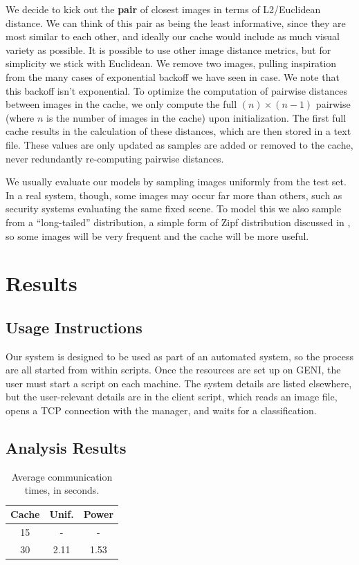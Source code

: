 \documentclass[12pt]{article}
\begin{document}
We decide to kick out the \textbf{pair} of closest images in terms of L2/Euclidean distance. We can think of this pair as being the least informative, since they are most similar to each other, and ideally our cache would include as much visual variety as possible. It is possible to use other image distance metrics, but for simplicity we stick with Euclidean. We remove two images, pulling inspiration from the many cases of exponential backoff we have seen in case. We note that this backoff isn't exponential. To optimize the computation of pairwise distances between images in the cache, we only compute the full $(n) \times (n-1)$ pairwise (where $n$ is the number of images in the cache) upon initialization. The first full cache results in the calculation of these distances, which are then stored in a text file. These values are only updated as samples are added or removed to the cache, never redundantly re-computing pairwise distances.

We usually evaluate our models by sampling images uniformly from the test set.
In a real system, though, some images may occur far more than others, such as security systems evaluating the same fixed scene.
To model this we also sample from a ``long-tailed'' distribution, a simple form of Zipf distribution discussed in \cite{mitzenmacher}, so some images will be very frequent and the cache will be more useful.

\section{Results}

\subsection{Usage Instructions}

Our system is designed to be used as part of an automated system, so the process are all started from within scripts.
Once the resources are set up on GENI, the user must start a script on each machine.
The system details are listed elsewhere, but the user-relevant details are in the client script, which reads an image file, opens a TCP connection with the manager, and waits for a classification.

\subsection{Analysis Results}

\begin{table}
    \begin{tabular}{|c|c|c|}
        \hline
        Cache & Unif. & Power \\ \hline
        15 & - & - \\ \hline
        30 & 2.11 & 1.53 \\ \hline
    \end{tabular}
    \caption{Average communication times, in seconds.}%
    \label{tab:cache}
\end{table}
\end{document}
